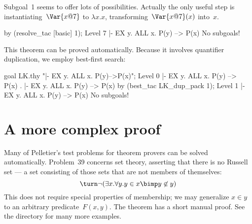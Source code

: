 Subgoal~1 seems to offer lots of possibilities.  Actually the only useful
step is instantiating~$\Var{x@7}$ to $\lambda x.x$,
transforming~$\Var{x@7}(x)$ into~$x$.
\begin{ttbox}
by (resolve_tac [basic] 1);
{\out Level 7}
{\out  |- EX y. ALL x. P(y) --> P(x)}
{\out No subgoals!}
\end{ttbox}
This theorem can be proved automatically.  Because it involves quantifier
duplication, we employ best-first search:
\begin{ttbox}
goal LK.thy "|- EX y. ALL x. P(y)-->P(x)";
{\out Level 0}
{\out  |- EX y. ALL x. P(y) --> P(x)}
{.  |- EX y. ALL x. P(y) --> P(x)}
by (best_tac LK_dup_pack 1);
{\out Level 1}
{\out  |- EX y. ALL x. P(y) --> P(x)}
{\out No subgoals!}
\end{ttbox}



\section{A more complex proof}
Many of Pelletier's test problems for theorem provers \cite{pelletier86}
can be solved automatically.  Problem~39 concerns set theory, asserting
that there is no Russell set --- a set consisting of those sets that are
not members of themselves:
\[  \turn \neg (\exists x. \forall y. y\in x \bimp y\not\in y) \]
This does not require special properties of membership; we may
generalize $x\in y$ to an arbitrary predicate~$F(x,y)$.  The theorem has a
short manual proof.  See the directory  for many more
examples.

